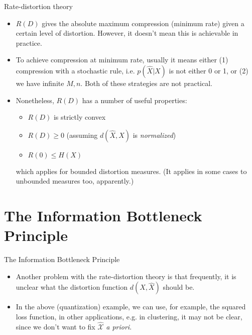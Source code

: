 \documentclass{beamer}
\begin{document}
\begin{frame}{Rate-distortion theory}
	\begin{itemize}
		\item $R(D)$ gives the absolute maximum compression (minimum rate) given a certain level of distortion. However, it doesn't mean this is achievable in practice. 
		\item To achieve compression at minimum rate, usually it means either (1) compression with a stochastic rule, i.e. $p(\hat{X}|X)$ is not either 0 or 1, or (2) we have infinite $M, n$. Both of these strategies are not practical. 
		\item Nonetheless, $R(D)$ has a number of useful properties: 
		\begin{itemize}
			\item $R(D)$ is strictly convex
			\item $R(D) \geq 0$ (assuming $d(\hat{X}, X)$ is \emph{normalized})
			\item $R(0) \leq H(X)$
		\end{itemize}
		which applies for bounded distortion measures. (It applies in some cases to unbounded measures too, apparently.)
	\end{itemize}
\end{frame}

\section{The Information Bottleneck Principle}
\begin{frame}{The Information Bottleneck Principle}
\begin{itemize}
	\item Another problem with the rate-distortion theory is that frequently, it is unclear what the distortion function $d(X, \hat{X})$ should be. 
	\item In the above (quantization) example, we can use, for example, the squared loss function, in other applications, e.g. in clustering, it may not be clear, since we don't want to fix $\hat{\mathcal{X}}$ \emph{a priori}. 
\end{itemize}
\end{frame}
\end{document}
